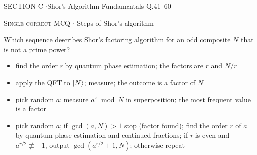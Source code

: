 \documentclass[11pt,a4paper]{article}
\newcommand{\optlabel}[1]{\textbf{(#1)}}
\newcommand{\correctlabel}[1]{\textcolor{okgreen}{\textbf{(#1)}\,\ding{51}}}
\newenvironment{qitem}[1]{\begin{list}{}{\setlength{\leftmargin}{3.3em}\setlength{\labelwidth}{3.1em}%
  \setlength{\labelsep}{0.2em}\setlength{\topsep}{3pt}\setlength{\parsep}{3pt}}\item[\textbf{Q.#1}\hfill]}{\end{list}}
\newcommand{\qmeta}[2]{{\footnotesize\color{black!60}\textsc{#1} \;$\cdot$\; #2}\par}
\begin{document}
\newpage

\begin{sectionbanner}SECTION C \enspace$\cdot$\enspace Shor's Algorithm Fundamentals \hfill Q.41--60\end{sectionbanner}

\begin{qitem}{41}
\qmeta{Single-correct MCQ}{Steps of Shor's algorithm}
Which sequence describes Shor's factoring algorithm for an odd composite $N$ that is not a prime power?
\begin{itemize}[leftmargin=2.6em, labelsep=0.4em, itemsep=2pt, topsep=3pt]
\item[\optlabel{A}] find the order $r$ by quantum phase estimation; the factors are $r$ and $N/r$
\item[\optlabel{B}] apply the QFT to $\ket N$; measure; the outcome is a factor of $N$
\item[\optlabel{C}] pick random $a$; measure $a^x \bmod N$ in superposition; the most frequent value is a factor
\item[\correctlabel{D}] pick random $a$; if $\gcd(a, N) > 1$ stop (factor found); find the order $r$ of $a$ by quantum phase estimation and continued fractions; if $r$ is even and $a^{r/2} \not\equiv -1$, output $\gcd(a^{r/2} \pm 1, N)$; otherwise repeat
\end{itemize}
\end{qitem}
\end{document}
